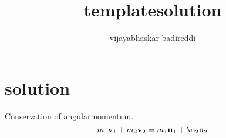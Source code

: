 \documentclass[12pt] {article}
\title{templatesolution}
\author{vijayabhaskar badireddi}
\begin{document}
        
\section*{solution}
Conservation of angularmomentum. 
\[m_1\vb{v}_1+m_2\vb{v}_2=m_1\vb{u}_1+\m_2\vb{u}_2\]
\end{document}
